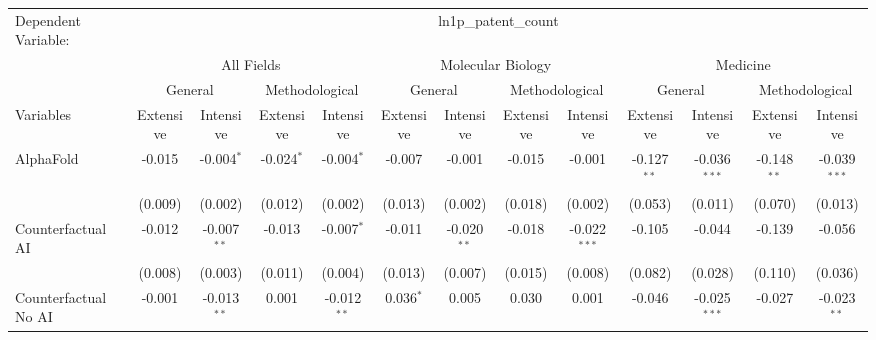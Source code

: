 \begingroup
\centering
\begin{tabular}{lcccccccccccc}
   \tabularnewline \midrule \midrule
   Dependent Variable: & \multicolumn{12}{c}{ln1p\_patent\_count}\\
 & \multicolumn{4}{c}{All Fields} & \multicolumn{4}{c}{Molecular Biology} & \multicolumn{4}{c}{Medicine} \\
\cmidrule(lr){2-5} \cmidrule(lr){6-9} \cmidrule(lr){10-13}
 & \multicolumn{2}{c}{General} & \multicolumn{2}{c}{Methodological} & \multicolumn{2}{c}{General} & \multicolumn{2}{c}{Methodological} & \multicolumn{2}{c}{General} & \multicolumn{2}{c}{Methodological} \\
\cmidrule(lr){2-3} \cmidrule(lr){4-5} \cmidrule(lr){6-7} \cmidrule(lr){8-9} \cmidrule(lr){10-11} \cmidrule(lr){12-13}
Variables & \multicolumn{1}{c}{Extensive} & \multicolumn{1}{c}{Intensive} & \multicolumn{1}{c}{Extensive} & \multicolumn{1}{c}{Intensive} & \multicolumn{1}{c}{Extensive} & \multicolumn{1}{c}{Intensive} & \multicolumn{1}{c}{Extensive} & \multicolumn{1}{c}{Intensive} & \multicolumn{1}{c}{Extensive} & \multicolumn{1}{c}{Intensive} & \multicolumn{1}{c}{Extensive} & \multicolumn{1}{c}{Intensive} \\
\cmidrule(lr){1-1}\cmidrule(lr){2-2} \cmidrule(lr){3-3} \cmidrule(lr){4-4} \cmidrule(lr){5-5} \cmidrule(lr){6-6} \cmidrule(lr){7-7} \cmidrule(lr){8-8} \cmidrule(lr){9-9} \cmidrule(lr){10-10} \cmidrule(lr){11-11} \cmidrule(lr){12-12} \cmidrule(lr){13-13}
   AlphaFold                                & -0.015         & -0.004$^{*}$   & -0.024$^{*}$   & -0.004$^{*}$   & -0.007      & -0.001        & -0.015  & -0.001         & -0.127$^{**}$ & -0.036$^{***}$ & -0.148$^{**}$ & -0.039$^{***}$\\   
                                            & (0.009)        & (0.002)        & (0.012)        & (0.002)        & (0.013)     & (0.002)       & (0.018) & (0.002)        & (0.053)       & (0.011)        & (0.070)       & (0.013)\\   
   Counterfactual AI                        & -0.012         & -0.007$^{**}$  & -0.013         & -0.007$^{*}$   & -0.011      & -0.020$^{**}$ & -0.018  & -0.022$^{***}$ & -0.105        & -0.044         & -0.139        & -0.056\\   
                                            & (0.008)        & (0.003)        & (0.011)        & (0.004)        & (0.013)     & (0.007)       & (0.015) & (0.008)        & (0.082)       & (0.028)        & (0.110)       & (0.036)\\   
   Counterfactual No AI                     & -0.001         & -0.013$^{**}$  & 0.001          & -0.012$^{**}$  & 0.036$^{*}$ & 0.005         & 0.030   & 0.001          & -0.046        & -0.025$^{***}$ & -0.027        & -0.023$^{**}$\\   

\end{tabular}
